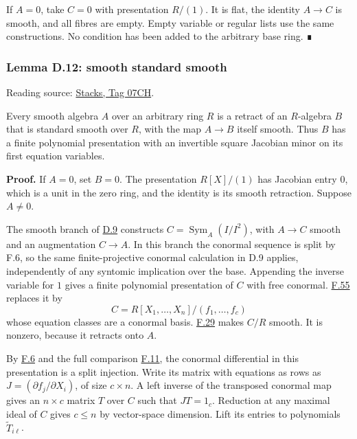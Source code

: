 \documentclass[11pt,a4paper,openany]{report}
\begin{document}
If \(A=0\), take \(C=0\) with presentation \(R/(1)\). It is flat, the identity \(A\to C\) is smooth, and all fibres are empty. Empty variable or regular lists use the same constructions. No condition has been added to the arbitrary base ring. ∎

\label{AG-RG-S05-smoothing-lemma-smooth-standard-smooth}

\subsubsection{Lemma D.12: smooth standard smooth}\label{AG-RG-S05-lemma-d.12-smooth-standard-smooth}

Reading source: \href{https://stacks.math.columbia.edu/tag/07CH}{Stacks, Tag 07CH}.

Every smooth algebra \(A\) over an arbitrary ring \(R\) is a retract of an \(R\)-algebra \(B\) that is standard smooth over \(R\), with the map \(A\to B\) itself smooth. Thus \(B\) has a finite polynomial presentation with an invertible square Jacobian minor on its first equation variables.

\textbf{Proof.} If \(A=0\), set \(B=0\). The presentation \(R[X]/(1)\) has Jacobian entry \(0\), which is a unit in the zero ring, and the identity is its smooth retraction. Suppose \(A\ne0\).

The smooth branch of \hyperref[AG-RG-S05-smoothing-lemma-improve-presentation]{D.9} constructs \(C=\operatorname{Sym}_A(I/I^2)\), with \(A\to C\) smooth and an augmentation \(C\to A\). In this branch the conormal sequence is split by F.6, so the same finite-projective conormal calculation in D.9 applies, independently of any syntomic implication over the base. Appending the inverse variable for \(1\) gives a finite polynomial presentation of \(C\) with free conormal. \hyperref[AG-RG-S05-algebra-lemma-huber]{F.55} replaces it by \[C=R[X_1,\ldots,X_n]/(f_1,\ldots,f_c)\] whose equation classes are a conormal basis. \hyperref[AG-RG-S05-algebra-lemma-compose-smooth]{F.29} makes \(C/R\) smooth. It is nonzero, because it retracts onto \(A\).

By \hyperref[AG-RG-S05-algebra-definition-smooth]{F.6} and the full comparison \hyperref[AG-RG-S05-algebra-lemma-NL-homotopy]{F.11}, the conormal differential in this presentation is a split injection. Write its matrix with equations as rows as \(J=(\partial f_j/\partial X_i)\), of size \(c\times n\). A left inverse of the transposed conormal map gives an \(n\times c\) matrix \(T\) over \(C\) such that \(JT=1_c\). Reduction at any maximal ideal of \(C\) gives \(c\le n\) by vector-space dimension. Lift its entries to polynomials \(\widetilde T_{i\ell}\).
\end{document}
